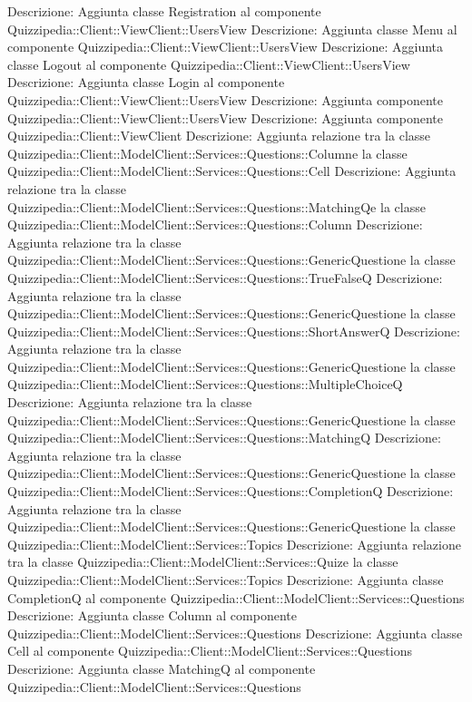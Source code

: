 Descrizione: Aggiunta classe Registration al componente Quizzipedia::Client::ViewClient::UsersView 
Descrizione: Aggiunta classe Menu al componente Quizzipedia::Client::ViewClient::UsersView 
Descrizione: Aggiunta classe Logout al componente Quizzipedia::Client::ViewClient::UsersView 
Descrizione: Aggiunta classe Login al componente Quizzipedia::Client::ViewClient::UsersView 
Descrizione: Aggiunta componente Quizzipedia::Client::ViewClient::UsersView 
Descrizione: Aggiunta componente Quizzipedia::Client::ViewClient 
Descrizione: Aggiunta relazione tra la classe Quizzipedia::Client::ModelClient::Services::Questions::Columne la classe Quizzipedia::Client::ModelClient::Services::Questions::Cell 
Descrizione: Aggiunta relazione tra la classe Quizzipedia::Client::ModelClient::Services::Questions::MatchingQe la classe Quizzipedia::Client::ModelClient::Services::Questions::Column 
Descrizione: Aggiunta relazione tra la classe Quizzipedia::Client::ModelClient::Services::Questions::GenericQuestione la classe Quizzipedia::Client::ModelClient::Services::Questions::TrueFalseQ 
Descrizione: Aggiunta relazione tra la classe Quizzipedia::Client::ModelClient::Services::Questions::GenericQuestione la classe Quizzipedia::Client::ModelClient::Services::Questions::ShortAnswerQ 
Descrizione: Aggiunta relazione tra la classe Quizzipedia::Client::ModelClient::Services::Questions::GenericQuestione la classe Quizzipedia::Client::ModelClient::Services::Questions::MultipleChoiceQ 
Descrizione: Aggiunta relazione tra la classe Quizzipedia::Client::ModelClient::Services::Questions::GenericQuestione la classe Quizzipedia::Client::ModelClient::Services::Questions::MatchingQ 
Descrizione: Aggiunta relazione tra la classe Quizzipedia::Client::ModelClient::Services::Questions::GenericQuestione la classe Quizzipedia::Client::ModelClient::Services::Questions::CompletionQ 
Descrizione: Aggiunta relazione tra la classe Quizzipedia::Client::ModelClient::Services::Questions::GenericQuestione la classe Quizzipedia::Client::ModelClient::Services::Topics 
Descrizione: Aggiunta relazione tra la classe Quizzipedia::Client::ModelClient::Services::Quize la classe Quizzipedia::Client::ModelClient::Services::Topics 
Descrizione: Aggiunta classe CompletionQ al componente Quizzipedia::Client::ModelClient::Services::Questions 
Descrizione: Aggiunta classe Column al componente Quizzipedia::Client::ModelClient::Services::Questions 
Descrizione: Aggiunta classe Cell al componente Quizzipedia::Client::ModelClient::Services::Questions 
Descrizione: Aggiunta classe MatchingQ al componente Quizzipedia::Client::ModelClient::Services::Questions 
